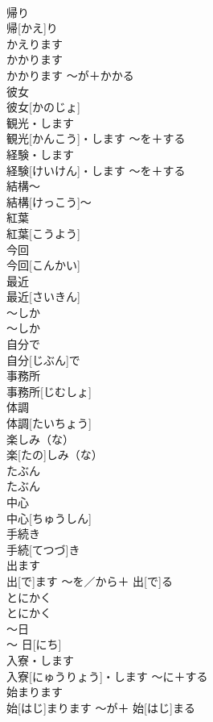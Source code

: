 \documentclass[8pt]{extreport}
\begin{document}
\begin{CJK}{UTF8}{min}
\\	帰り	
\\	帰[かえ]り	
\\	かえります 
\\	かかります	
\\	かかります	〜が＋かかる	
\\	彼女	
\\	彼女[かのじょ]		
\\	観光・します	
\\	観光[かんこう]・します	〜を＋する	
\\	経験・します	
\\	経験[けいけん]・します	〜を＋する	
\\	結構〜	
\\	結構[けっこう]〜		
\\	紅葉	
\\	紅葉[こうよう]		
\\	今回	
\\	今回[こんかい]		
\\	最近	
\\	最近[さいきん]		
\\	〜しか	
\\	〜しか		
\\	自分で	
\\	自分[じぶん]で		
\\	事務所	
\\	事務所[じむしょ]		
\\	体調	
\\	体調[たいちょう]		
\\	楽しみ（な）	
\\	楽[たの]しみ（な）		
\\	たぶん	
\\	たぶん		
\\	中心	
\\	中心[ちゅうしん]		
\\	手続き	
\\	手続[てつづ]き		
\\	出ます	
\\	出[で]ます	〜を／から＋ 出[で]る	
\\	とにかく	
\\	とにかく		
\\	〜日	
\\	〜 日[にち]		
\\	入寮・します	
\\	入寮[にゅうりょう]・します	〜に＋する	
\\	始まります	
\\	始[はじ]まります	〜が＋ 始[はじ]まる	

\end{CJK}
\end{document}
